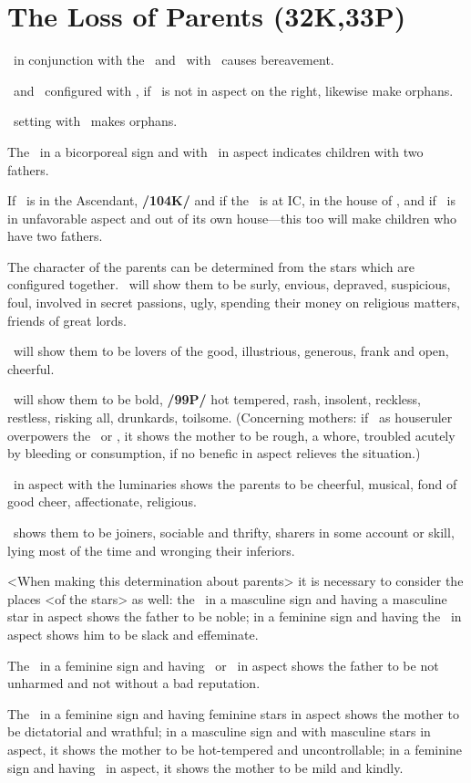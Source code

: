 \section{The Loss of Parents (32K,33P)}
\Mars\, in conjunction with the \Sun\, and \Square\, with \Saturn\, causes bereavement. 

\Saturn\, and \Mars\, configured with \Mercury, if \Jupiter\, is not in aspect on the right, likewise make orphans. 

\Saturn\, setting with \Jupiter\, makes orphans. 

The \Moon\, in a bicorporeal sign and with \Jupiter\, in aspect indicates children with two fathers. 

If \Venus\, is in the Ascendant, \textbf{/104K/} and if the \Moon\, is at IC, in the house of \Mars, and if \Jupiter\, is in unfavorable aspect and out of its own house—this too will make children who have two fathers.

The character of the parents can be determined from the stars which are configured together. \Saturn\, will show them to be surly, envious, depraved, suspicious, foul, involved in secret passions, ugly, spending their money on religious matters, friends of great lords. 

\Jupiter\, will show them to be lovers of the good, illustrious, generous, frank and open, cheerful. 

\Mars\, will show them to be bold, \textbf{/99P/} hot tempered, rash, insolent, reckless, restless, risking all, drunkards, toilsome. (Concerning mothers: if \Mars\,
as houseruler overpowers the \Moon\, or \Venus, it shows the mother to be rough, a whore, troubled acutely by bleeding or consumption, if no benefic in aspect relieves the situation.) 

\Venus\, in aspect with the luminaries shows the parents to be cheerful, musical, fond of good cheer, affectionate, religious. 

\Mercury\, shows them to be joiners, sociable and thrifty, sharers in some account or skill, lying most of the time and
wronging their inferiors.

<When making this determination about parents> it is necessary to consider the places <of the stars>
as well: the \Sun\, in a masculine sign and having a masculine star in aspect shows the father to be noble; in a
feminine sign and having the \Moon\, in aspect shows him to be slack and effeminate. 

The \Sun\, in a feminine sign and having \Saturn\, or \Venus\, in aspect shows the father to be not unharmed and not without a bad reputation. 

The \Moon\, in a feminine sign and having feminine stars in aspect shows the mother to be dictatorial and wrathful; in a masculine sign and with masculine stars in aspect, it shows the mother to be hot-tempered and uncontrollable; in a feminine sign and having \Jupiter\, in aspect, it shows the mother to be mild and kindly.

\newpage